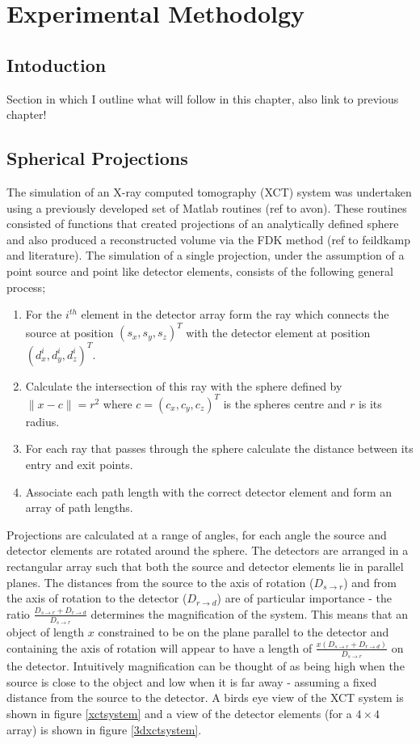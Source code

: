\documentclass[
  twoside,
  11pt, a4paper,
  footinclude=true,
  headinclude=true,
  cleardoublepage=empty
]{scrbook}
\begin{document}
\chapter{Experimental Methodolgy}
\section{Intoduction}

Section in which I outline what will follow in this chapter, also link to previous chapter!

\section{Spherical Projections}

The simulation of an X-ray computed tomography (XCT) system was undertaken using a previously developed set of Matlab routines (ref to avon). These routines consisted of functions that created projections of an analytically defined sphere and also produced a reconstructed volume via the FDK method (ref to feildkamp and literature). The simulation of a single projection, under the assumption of a point source and point like detector elements, consists of the following general process;

\begin{enumerate}
\item For the $i^{th}$ element in the detector array form the ray which connects the source at position $(s_x,s_y,s_z)^T$ with the detector element at position $(d_x^i,d_y^i,d_z^i)^T$.
\item Calculate the intersection of this ray with the sphere defined by $\|x - c\| = r^2$ where $c = (c_x,c_y,c_z)^T$ is the spheres centre and $r$ is its radius.
\item For each ray that passes through the sphere calculate the distance between its entry and exit points.
\item Associate each path length with the correct detector element and form an array of path lengths.
\end{enumerate}

Projections are calculated at a range of angles, for each angle the source and detector elements are rotated around the sphere. The detectors are arranged in a rectangular array such that both the source and detector elements lie in parallel planes. The distances from the source to the axis of rotation ($D_{s\rightarrow r}$) and from the axis of rotation to the detector ($D_{r \rightarrow d}$) are of particular importance - the ratio $\frac{D_{s\rightarrow r}+D_{r \rightarrow d}}{D_{s\rightarrow r}}$ determines the magnification of the system. This means that an object of length $x$ constrained to be on the plane parallel to the detector and containing the axis of rotation will appear to have a length of $\frac{x(D_{s\rightarrow r}+D_{r \rightarrow d})}{D_{s\rightarrow r}}$ on the detector. Intuitively magnification can be thought of as being high when the source is close to the object and low when it is far away - assuming a fixed distance from the source to the detector. A birds eye view of the XCT system is shown in figure \ref{xctsystem} and a view of the detector elements (for a $4\times4$ array) is shown in figure \ref{3dxctsystem}.
\end{document}
